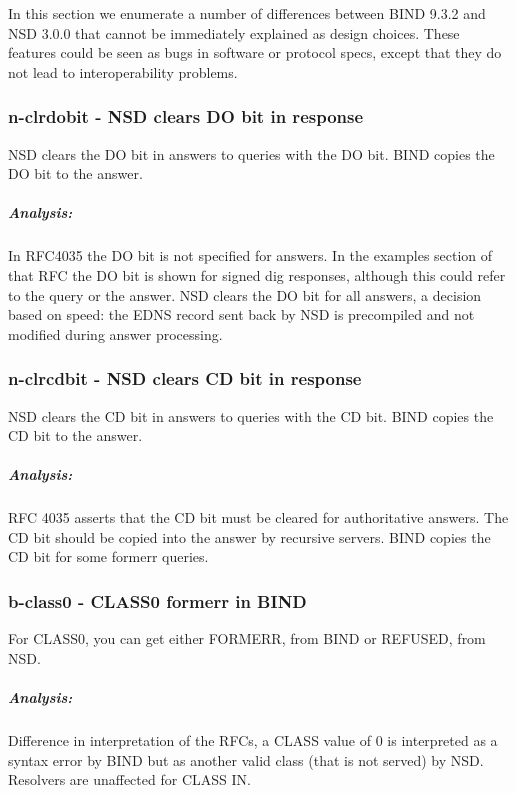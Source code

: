 \documentclass[twoside,titlepage,english]{nlnetlabs}
\begin{document}
In this section we enumerate a number of differences between 
BIND 9.3.2 and NSD 3.0.0 that cannot be immediately explained
as design choices. These features could be seen as bugs in software
or protocol specs, except that they do not lead to interoperability 
problems.


\subsubsection{n-clrdobit - NSD clears DO bit in response}
\label{n-clrdobit}

NSD clears the DO bit in answers to queries with the DO bit. BIND copies the
DO bit to the answer.

\vspace{-8pt}\subparagraph{Analysis:}

In RFC4035\cite{rfc4035} the DO bit is not specified for answers. In the examples section
of that RFC the DO bit is shown for signed dig responses, although this could 
refer to the query or the answer. NSD clears the DO bit for all answers, a 
decision based on speed: the EDNS record sent back by NSD is precompiled and
not modified during answer processing.


\subsubsection{n-clrcdbit - NSD clears CD bit in response}
\label{n-clrcdbit}

NSD clears the CD bit in answers to queries with the CD bit. BIND copies the
CD bit to the answer.

\vspace{-8pt}\subparagraph{Analysis:}

RFC 4035\cite{rfc4035} asserts that the CD bit must be cleared for 
authoritative answers. The CD bit should be copied into the answer
by recursive servers. BIND copies the CD bit for some formerr queries.


\subsubsection{b-class0 - CLASS0 formerr in BIND}
\label{b-class0}

For CLASS0, you can get either FORMERR, from BIND or REFUSED, from NSD.

\vspace{-8pt}\subparagraph{Analysis:}

Difference in interpretation of the RFCs, a CLASS value of 0 is interpreted
as a syntax error by BIND but as another valid class (that is not served)
by NSD. Resolvers are unaffected for CLASS IN.
\end{document}
